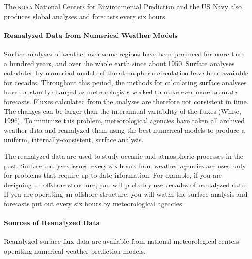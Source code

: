 The \textsc{noaa} National Centers for Environmental Prediction and the US Navy also produces global analyses and forecasts every six hours.

\paragraph{Reanalyzed Data from Numerical Weather Models}
Surface analyses of weather over some regions have been produced for more than a hundred years, and over the whole earth since about 1950. Surface analyses calculated by numerical models of the atmospheric circulation have been available for decades. Throughout this period, the methods for calculating surface analyses have constantly changed as meteorologists worked to make ever more accurate forecasts. Fluxes calculated from the analyses are therefore not consistent in time. The changes can be larger than the interannual variability of the fluxes (White, 1996). To minimize this problem, meteorological agencies have taken all archived weather data and reanalyzed them using the best numerical models to produce a uniform, internally-consistent, surface analysis.

The reanalyzed data are used to study oceanic and atmospheric processes in the past. Surface
analyses issued every six hours from weather agencies are used only for problems that require up-to-date information. For example, if you are designing an offshore structure, you will probably use decades of reanalyzed data. If you are operating an offshore structure, you will watch the surface analysis and forecasts put out every six hours by meteorological agencies.

\paragraph{Sources of Reanalyzed Data}
Reanalyzed surface
flux data are available from national meteorological centers operating numerical weather
prediction models.

